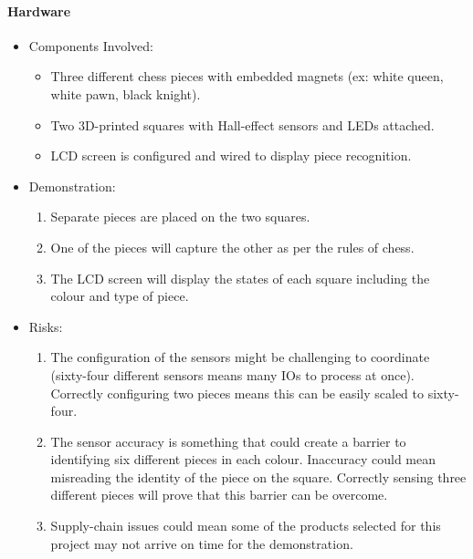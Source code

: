 \documentclass{article}
\begin{document}
\paragraph{Hardware}
\begin{itemize}
    \item Components Involved: 
    \begin{itemize}
        \item Three different chess pieces with embedded magnets (ex: white queen, white pawn, black knight).
        \item Two 3D-printed squares with Hall-effect sensors and LEDs attached.
        \item LCD screen is configured and wired to display piece recognition. 
    \end{itemize}
    \item Demonstration:
    \begin{enumerate}
        \item Separate pieces are placed on the two squares.  
        \item One of the pieces will capture the other as per the rules of chess.
        \item The LCD screen will display the states of each square including the colour and type of piece. 
    \end{enumerate} 
    \item Risks:
    \begin{enumerate}
        \item The configuration of the sensors might be challenging to coordinate (sixty-four different sensors means many IOs to process at once). Correctly configuring two pieces means this can be easily scaled to sixty-four.
        \item The sensor accuracy is something that could create a barrier to identifying six different pieces in each colour. Inaccuracy could mean misreading the identity of the piece on the square. Correctly sensing three different pieces will prove that this barrier can be overcome.
        \item Supply-chain issues could mean some of the products selected for this project may not arrive on time for the demonstration.
    \end{enumerate}
\end{itemize}
\end{document}
